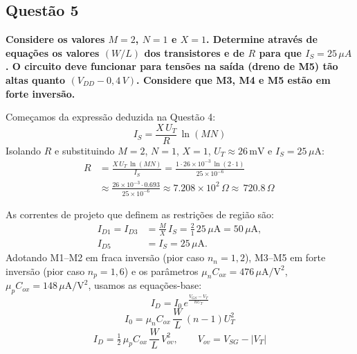 ﻿\documentclass[12pt,a4paper]{article}
\begin{document}
\subsection*{Questão 5}
\begin{BoxQ}
    \textbf{Considere os valores $M = 2$, $N = 1$ e $X = 1$. Determine através de equações os valores $(W/L)$ dos transistores e de $R$ para que $I_S = 25\,\mu A$. O circuito deve funcionar para tensões na saída (dreno de M5) tão altas quanto $(V_{DD} - 0{,}4\,V)$. Considere que M3, M4 e M5 estão em forte inversão.}
\end{BoxQ}

Começamos da expressão deduzida na Questão 4:
\begin{equation}
    I_S = \frac{X\,U_T}{R}\,\ln(MN)
\end{equation}
Isolando $R$ e substituindo $M=2$, $N=1$, $X=1$, $U_T\approx 26\,\text{mV}$ e $I_S=25\,\mu\text{A}$:
\begin{align} %
    R 
    &= \frac{X\,U_T\,\ln(MN)}{I_S}
     = \frac{1\cdot 26\times 10^{-3}\,\ln(2\cdot 1)}{25\times 10^{-6}} \\[4pt]
    &\approx \frac{26\times 10^{-3}\cdot 0.693}{25\times 10^{-6}}
     \approx 7.208\times 10^{2} \, \Omega
     \approx \boxed{\,720.8\,\Omega\,}
\end{align}

As correntes de projeto que definem as restrições de região são:
\begin{align}
    I_{D1} = I_{D3} &= \frac{M}{X}\,I_S = \frac{2}{1}\,25\,\mu\text{A} = 50\,\mu\text{A}, \\
    I_{D5} &= I_S = 25\,\mu\text{A}.
\end{align}
Adotando M1–M2 em fraca inversão (pior caso $n_n=1{,}2$), M3–M5 em forte inversão (pior caso $n_p=1{,}6$) e os parâmetros $\mu_n C_{ox}=476\,\mu\text{A}/\text{V}^2$, $\mu_p C_{ox}=148\,\mu\text{A}/\text{V}^2$, usamos as equações-base:
\begin{equation}\label{eq:weak-id}
I_D = I_0\, e^{\tfrac{V_{GS}-V_T}{nU_T}}
\end{equation}
\begin{equation}\label{eq:I0}
I_0 = \mu_n C_{ox}\,\frac{W}{L}\,(n-1)U_T^2
\end{equation}
\begin{equation}\label{eq:strong-id}
I_D = \tfrac{1}{2}\,\mu_p C_{ox}\,\frac{W}{L}\,V_{ov}^2,\qquad V_{ov}=V_{SG}-|V_T|
\end{equation}
\end{document}
